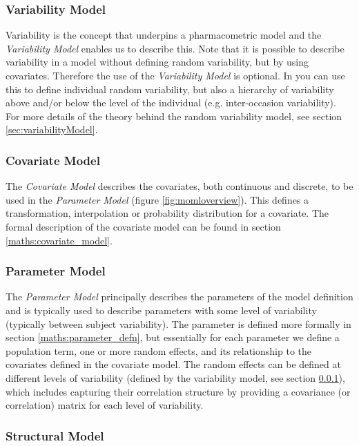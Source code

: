 \subsubsection{Variability Model}
\label{sec:variability_model}

Variability is the concept that underpins a pharmacometric model and
the \emph{Variability Model} enables us to describe this. Note that it
is possible to describe variability in a \pharmml model without
defining random variability, but by using covariates.
Therefore the use of the \emph{Variability Model}
is optional. In \pharmml you can use this to define
individual random variability, but also a hierarchy of variability
above and/or below the level of the individual (e.g.\xspace inter-occasion
variability). For more details of the theory behind the random
variability model, see section \ref{sec:variabilityModel}.


\subsubsection{Covariate Model}

The \emph{Covariate Model} describes the covariates, both continuous and discrete, 
to be used in the \emph{Parameter Model} (figure \ref{fig:momloverview}). 
This defines a transformation, interpolation or probability distribution 
for a covariate. The formal description of the covariate
model can be found in section \ref{maths:covariate_model}.

\subsubsection{Parameter Model}

The \emph{Parameter Model} principally describes the parameters of the model
definition and is typically used to describe parameters with some
level of variability (typically between subject variability). The
parameter is defined more formally in section
\ref{maths:parameter_defn}, but essentially for each parameter we
define a population term, one or more random effects, and its
relationship to the covariates defined in the covariate model. The
random effects can be defined at different levels of variability
(defined by the variability model, see section
\ref{sec:variability_model}), which includes capturing their correlation
structure by providing a covariance (or correlation)
matrix for each level of variability.

\subsubsection{Structural Model}


